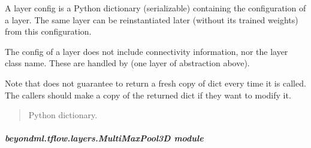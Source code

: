 \documentclass[letterpaper,10pt,english]{sphinxmanual}
\begin{document}
\begin{fulllineitems}
\begin{fulllineitems}
\sphinxAtStartPar
A layer config is a Python dictionary (serializable)
containing the configuration of a layer.
The same layer can be reinstantiated later
(without its trained weights) from this configuration.

\sphinxAtStartPar
The config of a layer does not include connectivity
information, nor the layer class name. These are handled
by  (one layer of abstraction above).

\sphinxAtStartPar
Note that  does not guarantee to return a fresh copy of
dict every time it is called. The callers should make a copy of the
returned dict if they want to modify it.
\begin{quote}\begin{description}
\sphinxAtStartPar
Python dictionary.

\end{description}\end{quote}

\end{fulllineitems}


\end{fulllineitems}



\subparagraph{beyondml.tflow.layers.MultiMaxPool3D module}
\label{\detokenize{beyondml.tflow.layers:module-beyondml.tflow.layers.MultiMaxPool3D}}\label{\detokenize{beyondml.tflow.layers:beyondml-tflow-layers-multimaxpool3d-module}}
\end{document}
